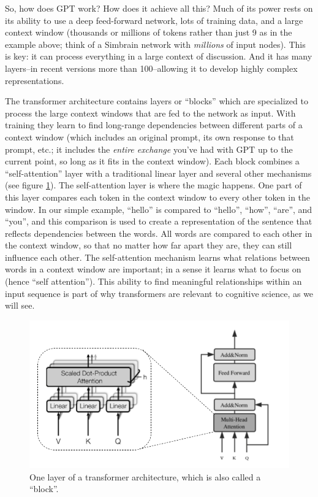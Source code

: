 So, how does GPT work? How does it achieve all this? Much of its power rests on its ability to use a deep feed-forward network, lots of training data, and a large context window (thousands or millions of tokens rather than just 9 as in the example above; think of a Simbrain network with \emph{millions} of input nodes). This is key: it can process everything in a large context of discussion.  And it has many layers--in recent versions more than 100--allowing it to develop highly complex representations.

The transformer architecture \cite{vaswani2017attention} contains layers or ``blocks'' which are specialized to process the large context windows that are fed to the network as input. With training they learn to find long-range dependencies between different parts of a context window (which includes an original prompt, its own response to that prompt, etc.; it includes the \emph{entire exchange} you've had with GPT up to the current point, so long as it fits in the context window). Each block combines  a ``self-attention'' layer with a traditional linear layer and several other mechanisms (see figure \ref{transformerBlock}). The self-attention layer is where the magic happens.  One part of this layer compares each token in the context window to every other token in the window. In our simple example, ``hello'' is compared to ``hello'', ``how'', ``are'', and ``you'', and this comparison is used to create a representation of the sentence that reflects dependencies between the words. All words are compared to each other in the context window, so that no matter how far apart they are, they can still influence each other. The self-attention mechanism learns what relations between words in a context window are important; in a sense it learns what to focus on (hence ``self attention''). This ability to find meaningful relationships within an input sequence is part of why transformers are relevant to cognitive science, as we will see.

\begin{figure}[h]
\centering
\includegraphics[scale=.4]{./images/transformerBlock.png}
\caption[Jeff Yoshimi modification of Todo.]{One layer of a transformer architecture, which is also called a ``block''. }
\label{transformerBlock}
\end{figure}

